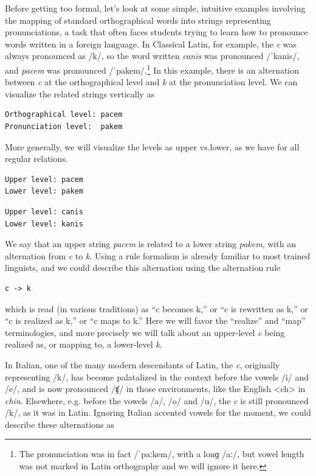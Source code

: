Before getting too formal, let's look at some simple, intuitive examples involving the
mapping of standard
orthographical words into strings representing pronunciations, a task that often faces students trying
to learn how to pronounce words written in a foreign language.  In Classical
Latin, for example, the \emph{c} was always
pronounced as /k/, so the word written \emph{canis} was
pronounced /ˈkanis/, and \emph{pacem} was pronounced
/ˈpakem/.\footnote{The pronunciation was in fact /ˈpaːkem/, with a lonɡ
/aː/, but vowel length was not marked in Latin orthography and we will
ignore it here.} In this example,
there is an alternation between \emph{c} at the orthographical level and
\emph{k} at the pronunciation level.  We can visualize the related strings vertically as

\begin{Verbatim}
Orthographical level: pacem
Pronunciation level:  pakem
\end{Verbatim}

\noindent
More generally, we will visualize the levels as upper vs.\@ lower, as we have for all regular
relations.

\begin{Verbatim}
Upper level: pacem
Lower level: pakem
\end{Verbatim}

\begin{Verbatim}
Upper level: canis
Lower level: kanis
\end{Verbatim}

\noindent
We say that an upper string \emph{pacem} is related to a lower string
\emph{pakem}, with an alternation from \emph{c} to \emph{k}.
Using a rule formalism is already familiar to most trained linguists, and we could describe this alternation
using the alternation rule

\begin{Verbatim}
c -> k
\end{Verbatim}

\noindent
which is read (in various traditions) as ``c becomes k,'' or ``c is rewritten as k,'' or ``c is realized
as k,'' or ``c
maps to k.''  Here we will favor the ``realize'' and ``map'' terminologies, and more precisely we will
talk about an upper-level \emph{c} being realized as, or mapping to, a lower-level \emph{k}.

In Italian, one of the many modern descendants of Latin, the \emph{c}, originally representing /k/, has become palatalized in the context before the vowels /i/ and
/e/, and is now pronounced /ʧ/ in those environments, like the English
<ch> in \emph{chin}.  Elsewhere, e.g.\@
before the vowels /a/, /o/ and /u/, the \emph{c} is still pronounced /k/,
as it was in Latin.  Ignoring Italian accented vowels for the moment, we could
describe these alternations as 

